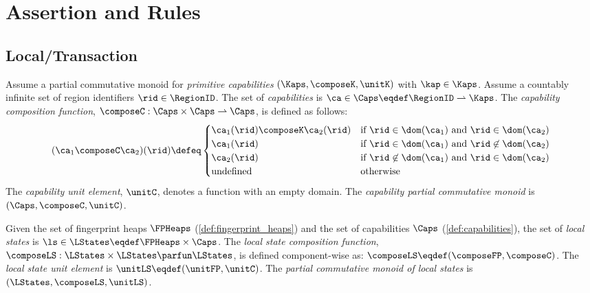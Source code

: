 \section{Assertion and Rules\label{sec:assertion}}

\subsection{Local/Transaction}

\begin{definition}[capabilities]
\label{def:capabilities}
Assume a partial commutative monoid for \emph{primitive capabilities} $(\Kaps, \composeK, \unitK)$ with $\kap \in \Kaps$.
Assume a countably infinite set of region identifiers $\rid \in \RegionID$. The set of \emph{capabilities} is $\ca \in \Caps \eqdef \RegionID \rightharpoonup \Kaps$.
The \emph{capability composition function}, $\composeC: \Caps \times \Caps \rightharpoonup \Caps$, is defined as follows:
%
\[
	(\ca_1 \composeC \ca_2)(\rid) \defeq 
	\begin{cases}
		\ca_1(\rid) \composeK \ca_2(\rid) & \text{if } \rid \in \dom(\ca_1) \text{ and } \rid \in \dom(\ca_2) \\
		\ca_1(\rid) & \text{if } \rid \in \dom(\ca_1) \text{ and } \rid \not\in \dom(\ca_2) \\
		\ca_2(\rid) & \text{if } \rid \not\in \dom(\ca_1) \text{ and } \rid \in \dom(\ca_2) \\
		\text{undefined} & \text{otherwise}
	\end{cases}
\]
%
The \emph{capability unit element}, $\unitC$, denotes a function with an empty domain.
The \emph{capability partial commutative monoid} is $(\Caps, \composeC, \unitC)$. 
\end{definition}
 
\begin{definition}
\label{def:local_state}
Given the set of fingerprint heaps $\FPHeaps$ (\ref{def:fingerprint_heaps}) and the set of capabilities $\Caps$ (\ref{def:capabilities}), the set of \emph{local states} is $\ls \in \LStates \eqdef \FPHeaps \times \Caps$.
The \emph{local state composition function}, $\composeLS: \LStates \times \LStates \parfun \LStates$, is defined component-wise as: $\composeLS \eqdef (\composeFP, \composeC)$.
The \emph{local state unit element} is $\unitLS \eqdef (\unitFP, \unitC)$.
The \emph{partial commutative monoid of local states} is $(\LStates, \composeLS, \unitLS)$.
\end{definition}
 
